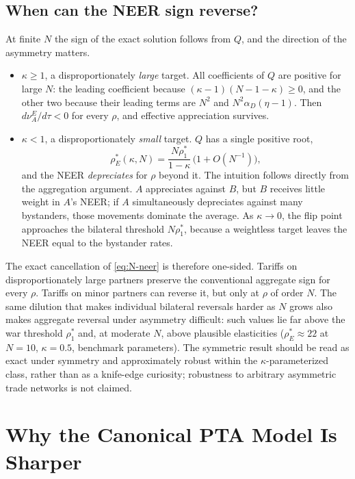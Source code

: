 \documentclass[11pt]{article}
\begin{document}
\subsection{When can the NEER sign reverse?}

At finite $N$ the sign of the exact solution follows from $Q$, and the direction of the asymmetry matters.
\begin{itemize}
\item $\kappa \geq 1$, a disproportionately \emph{large} target. All coefficients of $Q$ are positive for large $N$: the leading coefficient because $(\kappa-1)(N-1-\kappa) \geq 0$, and the other two because their leading terms are $N^2$ and $N^2\alpha_D(\eta-1)$. Then $d\nu_A^E/d\tau < 0$ for every $\rho$, and effective appreciation survives.
\item $\kappa < 1$, a disproportionately \emph{small} target. $Q$ has a single positive root,
\begin{equation}
\rho_E^*(\kappa, N) = \frac{N\rho_1^*}{1-\kappa}\,\big(1 + O(N^{-1})\big),
\label{eq:kappa-flip}
\end{equation}
and the NEER \emph{depreciates} for $\rho$ beyond it. The intuition follows directly from the aggregation argument. $A$ appreciates against $B$, but $B$ receives little weight in $A$'s NEER; if $A$ simultaneously depreciates against many bystanders, those movements dominate the average. As $\kappa \to 0$, the flip point approaches the bilateral threshold $N\rho_1^*$, because a weightless target leaves the NEER equal to the bystander rates.
\end{itemize}
The exact cancellation of \eqref{eq:N-neer} is therefore one-sided. Tariffs on disproportionately large partners preserve the conventional aggregate sign for every $\rho$. Tariffs on minor partners can reverse it, but only at $\rho$ of order $N$. The same dilution that makes individual bilateral reversals harder as $N$ grows also makes aggregate reversal under asymmetry difficult: such values lie far above the war threshold $\rho_1^*$ and, at moderate $N$, above plausible elasticities ($\rho_E^* \approx 22$ at $N = 10$, $\kappa = 0.5$, benchmark parameters). The symmetric result should be read as exact under symmetry and approximately robust within the $\kappa$-parameterized class, rather than as a knife-edge curiosity; robustness to arbitrary asymmetric trade networks is not claimed.

\section{Why the Canonical PTA Model Is Sharper}
\end{document}
